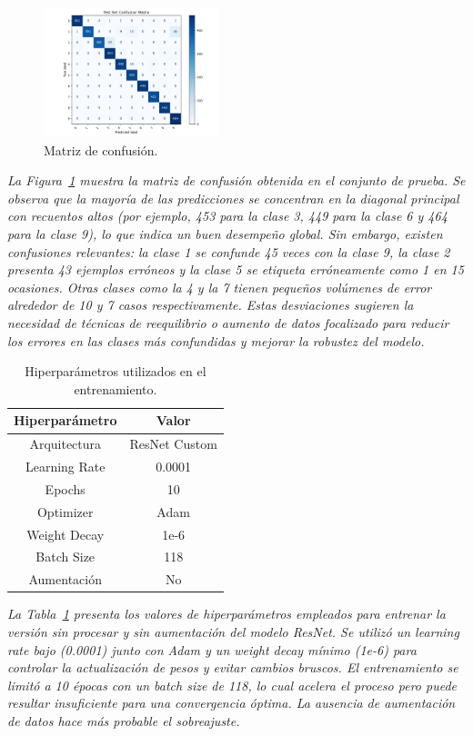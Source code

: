 \documentclass[conference]{IEEEtran}
\begin{document}
\begin{figure}[H]
    \centering
    \includegraphics[width=0.45\textwidth]{graphics-resnet-raw/resnet_raw_without_confusion_matrix.png}
    \caption{Matriz de confusión.}
    \label{fig:resnet_raw_without_confusion_matrix}
\end{figure}
\noindent\textit{%
La Figura~\ref{fig:resnet_raw_without_confusion_matrix} muestra la matriz de confusión obtenida en el conjunto de prueba. Se observa que la mayoría de las predicciones se concentran en la diagonal principal con recuentos altos (por ejemplo, 453 para la clase 3, 449 para la clase 6 y 464 para la clase 9), lo que indica un buen desempeño global. Sin embargo, existen confusiones relevantes: la clase 1 se confunde 45 veces con la clase 9, la clase 2 presenta 43 ejemplos erróneos y la clase 5 se etiqueta erróneamente como 1 en 15 ocasiones. Otras clases como la 4 y la 7 tienen pequeños volúmenes de error alrededor de 10 y 7 casos respectivamente. Estas desviaciones sugieren la necesidad de técnicas de reequilibrio o aumento de datos focalizado para reducir los errores en las clases más confundidas y mejorar la robustez del modelo.%
}

\begin{table}[H]
    \centering
    \begin{tabular}{|c|c|}
        \hline
        \textbf{Hiperparámetro} & \textbf{Valor} \\
        \hline
        Arquitectura & ResNet Custom \\
        Learning Rate & 0.0001 \\
        Epochs & 10 \\
        Optimizer & Adam \\
        Weight Decay & 1e-6 \\
        Batch Size & 118 \\
        Aumentación & No \\
        \hline
    \end{tabular}
    \caption{Hiperparámetros utilizados en el entrenamiento.}
    \label{tab:resnet_raw_without_hparams}
\end{table}
\noindent\textit{%
La Tabla~\ref{tab:resnet_raw_without_hparams} presenta los valores de hiperparámetros empleados para entrenar la versión sin procesar y sin aumentación del modelo ResNet. Se utilizó un learning rate bajo (0.0001) junto con Adam y un weight decay mínimo (1e-6) para controlar la actualización de pesos y evitar cambios bruscos. El entrenamiento se limitó a 10 épocas con un batch size de 118, lo cual acelera el proceso pero puede resultar insuficiente para una convergencia óptima. La ausencia de aumentación de datos hace más probable el sobreajuste.
}
\end{document}
